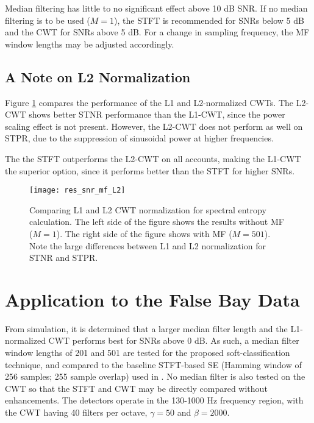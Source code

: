 Median filtering has little to no significant effect above 10 dB SNR. If no median filtering is to be used ($M=1$), the STFT is recommended for SNRs below 5 dB and the CWT for SNRs above 5 dB. For a change in sampling frequency, the MF window lengths may be adjusted accordingly.



\subsection{A Note on L2 Normalization}

Figure \ref{fig:res_snr_mf_L2} compares the performance of the L1 and L2-normalized CWTs. The L2-CWT shows better STNR performance than the L1-CWT, since the power scaling effect is not present. However, the L2-CWT does not perform as well on STPR, due to the suppression of sinusoidal power at higher frequencies. 

The the STFT outperforms the L2-CWT on all accounts, making the L1-CWT the superior option, since it performs better than the STFT for higher SNRs.


\begin{figure}[h!]
	\centering
	\texttt{[image: res\_snr\_mf\_L2]}
	\caption{Comparing L1 and L2 CWT normalization for spectral entropy calculation. The left side of the figure shows the results without MF ($M=1$). The right side of the figure shows with MF ($M=501$). Note the large differences between L1 and L2 normalization for STNR and STPR.}
	\label{fig:res_snr_mf_L2}
\end{figure}

\section{Application to the False Bay Data}

From simulation, it is determined that a larger median filter length and the L1-normalized CWT performs best for SNRs above 0 dB. As such, a median filter window lengths of 201 and 501 are tested for the proposed soft-classification technique, and compared to the baseline STFT-based SE (Hamming window of 256 samples; 255 sample overlap) used in \citep{entropyJASA}. No median filter is also tested on the CWT so that the STFT and CWT may be directly compared without enhancements. The detectors operate in the 130-1000 Hz frequency region, with the CWT having 40 filters per octave, $\gamma = 50$ and $\beta = 2000$.



